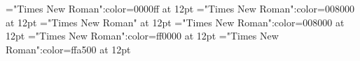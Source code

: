 \documentclass[a4paper]{article}
\begin{document}
 
\pagestyle{plain} 
\font\xitemxitemmain="Times New Roman":color=0000ff at 12pt
\font\xitemenmain="Times New Roman":color=008000 at 12pt
\font\main="Times New Roman" at 12pt
\font\xitemenxitem="Times New Roman":color=008000 at 12pt
\font\xitemmain="Times New Roman":color=ff0000 at 12pt
\font\xitemen="Times New Roman":color=ffa500 at 12pt
\pagestyle{fancy} 








\end{document}
